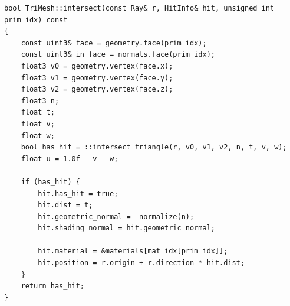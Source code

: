 \begin{lstlisting}
bool TriMesh::intersect(const Ray& r, HitInfo& hit, unsigned int prim_idx) const
{
	const uint3& face = geometry.face(prim_idx);
	const uint3& in_face = normals.face(prim_idx);
	float3 v0 = geometry.vertex(face.x);
	float3 v1 = geometry.vertex(face.y);
	float3 v2 = geometry.vertex(face.z);
	float3 n;
	float t;
	float v;
	float w;
	bool has_hit = ::intersect_triangle(r, v0, v1, v2, n, t, v, w);
	float u = 1.0f - v - w;
	
	if (has_hit) {
		hit.has_hit = true;
		hit.dist = t;
		hit.geometric_normal = -normalize(n);
		hit.shading_normal = hit.geometric_normal;
		
		hit.material = &materials[mat_idx[prim_idx]];
		hit.position = r.origin + r.direction * hit.dist;
	}
	return has_hit;
}
\end{lstlisting}

